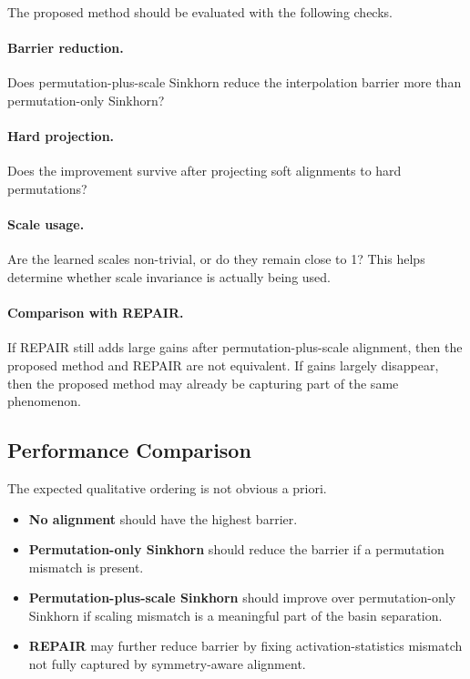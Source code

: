 \documentclass[11pt,a4paper]{article}
\begin{document}
The proposed method should be evaluated with the following checks.

\paragraph{Barrier reduction.}
Does permutation-plus-scale Sinkhorn reduce the interpolation barrier more than permutation-only Sinkhorn?
\paragraph{Hard projection.}
Does the improvement survive after projecting soft alignments to hard permutations?
\paragraph{Scale usage.}
Are the learned scales non-trivial, or do they remain close to 1? This helps determine whether scale invariance is actually being used.
\paragraph{Comparison with REPAIR.}
If REPAIR still adds large gains after permutation-plus-scale alignment, then the proposed method and REPAIR are not equivalent. If gains largely disappear, then the proposed method may already be capturing part of the same phenomenon.

\subsection{Performance Comparison}

The expected qualitative ordering is not obvious a priori.

\begin{itemize}
    \item \textbf{No alignment} should have the highest barrier.
    \item \textbf{Permutation-only Sinkhorn} should reduce the barrier if a permutation mismatch is present.
    \item \textbf{Permutation-plus-scale Sinkhorn} should improve over permutation-only Sinkhorn if scaling mismatch is a meaningful part of the basin separation.
    \item \textbf{REPAIR} may further reduce barrier by fixing activation-statistics mismatch not fully captured by symmetry-aware alignment.
\end{itemize}
\end{document}
